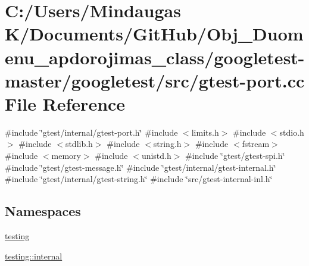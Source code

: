 \hypertarget{googletest-master_2googletest_2src_2gtest-port_8cc}{}\section{C\+:/\+Users/\+Mindaugas K/\+Documents/\+Git\+Hub/\+Obj\+\_\+\+Duomenu\+\_\+apdorojimas\+\_\+class/googletest-\/master/googletest/src/gtest-\/port.cc File Reference}
\label{googletest-master_2googletest_2src_2gtest-port_8cc}
{\ttfamily \#include \char`\"{}gtest/internal/gtest-\/port.\+h\char`\"{}}\newline
{\ttfamily \#include $<$limits.\+h$>$}\newline
{\ttfamily \#include $<$stdio.\+h$>$}\newline
{\ttfamily \#include $<$stdlib.\+h$>$}\newline
{\ttfamily \#include $<$string.\+h$>$}\newline
{\ttfamily \#include $<$fstream$>$}\newline
{\ttfamily \#include $<$memory$>$}\newline
{\ttfamily \#include $<$unistd.\+h$>$}\newline
{\ttfamily \#include \char`\"{}gtest/gtest-\/spi.\+h\char`\"{}}\newline
{\ttfamily \#include \char`\"{}gtest/gtest-\/message.\+h\char`\"{}}\newline
{\ttfamily \#include \char`\"{}gtest/internal/gtest-\/internal.\+h\char`\"{}}\newline
{\ttfamily \#include \char`\"{}gtest/internal/gtest-\/string.\+h\char`\"{}}\newline
{\ttfamily \#include \char`\"{}src/gtest-\/internal-\/inl.\+h\char`\"{}}\newline
\subsection*{Namespaces}
\begin{DoxyCompactItemize}
\item 
 \mbox{\hyperlink{namespacetesting}{testing}}
\item 
 \mbox{\hyperlink{namespacetesting_1_1internal}{testing\+::internal}}
\end{DoxyCompactItemize}
